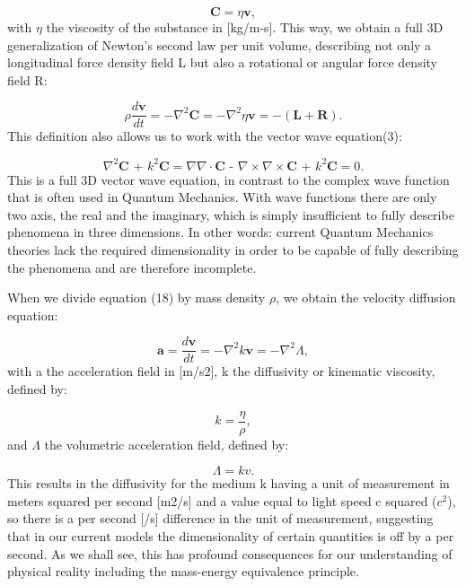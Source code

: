 \documentclass[twoside,final]{article}
\begin{document}
{\begin{equation}
\boldsymbol C=\eta \boldsymbol v,
\end{equation}
with $\eta $ the viscosity of the substance in [kg/m-s]. This way, we obtain a
full 3D generalization of Newton's second law per unit volume, describing not
only a longitudinal force density field L but also a rotational or angular force
density field R: 

\begin{equation}\label{seq:refText18}
\rho \frac{d\boldsymbol v}{\mathit{dt}}=-{\nabla}^2\boldsymbol C=-{\nabla}^2\eta \boldsymbol
v=-(\boldsymbol L+\boldsymbol R).
\end{equation}
This definition also allows us to work with the vector wave equation(3):

\begin{equation}
{\nabla}^2\boldsymbol C\text{ + }k^2\boldsymbol C=\nabla \nabla \cdot \boldsymbol C\text{ - }\nabla \times
\nabla \times \boldsymbol C\text{ + }k^2\boldsymbol C=0.
\end{equation}
This is a full 3D vector wave equation, in contrast to the complex wave function
that is often used in Quantum Mechanics. With wave functions there are only two
axis, the real and the imaginary, which is simply insufficient to fully describe
phenomena in three dimensions. In other words: current Quantum Mechanics
theories lack the required dimensionality in order to be capable of fully
describing the phenomena and are therefore incomplete. 

When we divide equation (18) by mass density $\rho $, we obtain the velocity
diffusion equation:

\begin{equation}\label{seq:refText20}
\boldsymbol a=\frac{d\boldsymbol v}{\mathit{dt}}=-{\nabla}^2k\boldsymbol v=-{\nabla}^2\Lambda ,
\end{equation}
with a the acceleration field in [m/s2], k the diffusivity or kinematic
viscosity, defined by:

\begin{equation}
k=\frac{\eta }{\rho },
\end{equation}
and $\Lambda $ the volumetric acceleration field, defined by: 

\begin{equation}
\Lambda =k\boldsymbol{\mathit{v.}}
\end{equation}
This results in the diffusivity for the medium k having a unit of measurement in
meters squared per second [m2/s] and a value equal to light speed c squared
($c^2$), so there is a per second [/s] difference in the unit of measurement,
suggesting that in our current models the dimensionality of certain quantities
is off by a per second. As we shall see, this has profound consequences for our
understanding of physical reality including the mass-energy equivalence
principle. 

}
\end{document}
